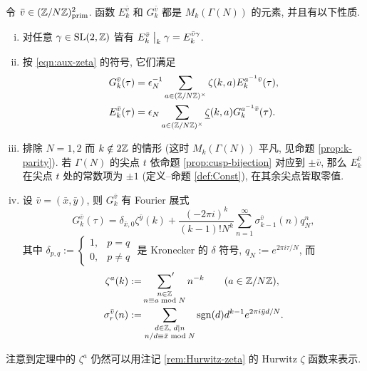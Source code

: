 \begin{theorem}\label{prop:Eisenstein-congruence-subgrp}
	令 $\bar{v} \in (\mathbb{Z}/N\mathbb{Z})^2_{\mathrm{prim}}$. 函数 $E^{\bar{v}}_k$ 和 $G^{\bar{v}}_k$ 都是 $M_k(\Gamma(N))$ 的元素, 并且有以下性质.
	\begin{enumerate}[(i)]
		\item 对任意 $\gamma \in \operatorname{SL}(2,\mathbb{Z})$ 皆有 $E^{\bar{v}}_k \;\big|_{k} \; \gamma = E^{\bar{v}\gamma}_k$.
		\item 按 \eqref{eqn:aux-zeta} 的符号, 它们满足
		\begin{align*}
			G^{\bar{v}}_k(\tau) & = \epsilon_N^{-1} \sum_{a \in (\mathbb{Z}/N\mathbb{Z})^\times} \zeta(k,a) E^{a^{-1}\bar{v}}_k(\tau), \\
			E^{\bar{v}}_k(\tau) & = \epsilon_N \sum_{a \in (\mathbb{Z}/N\mathbb{Z})^\times} \underline{\zeta}(k,a) G^{a^{-1}\bar{v}}_k(\tau).
		\end{align*}
		\item 排除 $N = 1, 2$ 而 $k \notin 2\mathbb{Z}$ 的情形 (这时 $M_k(\Gamma(N))$ 平凡, 见命题 \ref{prop:k-parity}). 若 $\Gamma(N)$ 的尖点 $t$ 依命题 \ref{prop:cusp-bijection} 对应到 $\pm\bar{v}$, 那么 $E^{\bar{v}}_k$ 在尖点 $t$ 处的常数项为 $\pm 1$ (定义--命题 \ref{def:Const}), 在其余尖点皆取零值.
		\item 设 $\bar{v}=(\bar{x},\bar{y})$, 则 $G^{\bar{v}}_k$ 有 Fourier 展式
		\[ G^{\bar{v}}_k(\tau) = \delta_{\bar{x},0} \zeta^{\bar{y}}(k) + \frac{(-2\pi i)^k}{(k-1)! N^k} \sum_{n=1}^\infty \sigma^{\bar{v}}_{k-1}(n) q_N^n, \]
		其中 $\delta_{p,q} := \begin{cases} 1, & p=q \\ 0, & p \neq q \end{cases}$ 是 Kronecker 的 $\delta$ 符号, $q_N := e^{2\pi i\tau/N}$, 而
		\begin{align*}
			\zeta^a(k) & := \sideset{}{'}\sum_{\substack{n \in \mathbb{Z} \\ n \equiv a \bmod N}} n^{-k} \qquad (a \in \mathbb{Z}/N\mathbb{Z}), \\
			\sigma^{\bar{v}}_r(n) & := \sum_{\substack{d \in \mathbb{Z}, \; d \mid n \\ n/d \equiv \bar{x} \bmod N }} \operatorname{sgn}(d) d^{k-1} e^{2\pi i \bar{y} d /N}.
		\end{align*}
	\end{enumerate}
\end{theorem}

注意到定理中的 $\zeta^a$ 仍然可以用注记 \ref{rem:Hurwitz-zeta} 的 Hurwitz $\zeta$ 函数来表示. 

